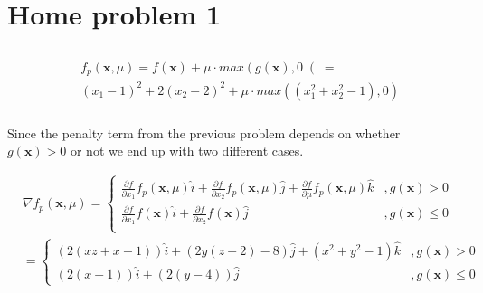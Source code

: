 \documentclass{article}
\begin{document}
\section{Home problem 1}
\subsection{}
\subsubsection{}

\begin{align*}
  &f_\mathit{p}(\mathbf{x}, \mu) = f(\mathbf{x}) + \mu \cdot max \left( g(\mathbf{x}), 0 \right(  = \\
  &(x_1 - 1)^2 + 2(x_2 - 2)^2 + \mu \cdot max \left( (x_1^2 + x_2^2 - 1 ), 0 \right)
\end{align*}

\subsubsection{}

Since the penalty term from the previous problem depends on whether
$g(\mathbf{x}) > 0$ or not we end up with two different cases.

\begin{align*}
  & \nabla f_\mathit{p}(\mathbf{x}, \mu) =
  \begin{cases}
    \frac{\partial f}{\partial x_1}f_\mathit{p}(\mathbf{x}, \mu) \hat{i} +
    \frac{\partial f}{\partial x_2}f_\mathit{p}(\mathbf{x}, \mu) \hat{j} +
    \frac{\partial f}{\partial \mu}f_\mathit{p}(\mathbf{x}, \mu) \hat{k} &,g(\mathbf{x}) > 0 \\
    \frac{\partial f}{\partial x_1}f(\mathbf{x}) \hat{i} +
    \frac{\partial f}{\partial x_2}f(\mathbf{x}) \hat{j} &,g(\mathbf{x}) \leq 0 \\
  \end{cases} \\
  & =
  \begin{cases}
    (2 (x z+x-1)) \hat{i} + (2 y (z + 2) - 8) \hat{j} + (x^2 + y^2 - 1) \hat{k} &,g(\mathbf{x}) > 0 \\
    (2 (x - 1)) \hat{i} + (2 (y - 4)) \hat{j} &,g(\mathbf{x}) \leq 0
  \end{cases}
\end{align*}

\subsection{}

\subsection{}
\end{document}
